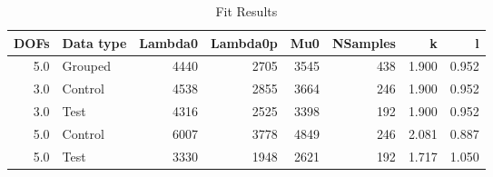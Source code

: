 \begin{table}
\centering
\caption{Fit Results}
\begin{tabular}{rlrrrrrr}
\toprule
 DOFs & Data type &  Lambda0 &  Lambda0p &   Mu0 &  NSamples &      k &      l \\
\midrule
  5.0 &   Grouped &     4440 &      2705 &  3545 &       438 &  1.900 &  0.952 \\
  3.0 &   Control &     4538 &      2855 &  3664 &       246 &  1.900 &  0.952 \\
  3.0 &      Test &     4316 &      2525 &  3398 &       192 &  1.900 &  0.952 \\
  5.0 &   Control &     6007 &      3778 &  4849 &       246 &  2.081 &  0.887 \\
  5.0 &      Test &     3330 &      1948 &  2621 &       192 &  1.717 &  1.050 \\
\bottomrule
\end{tabular}
\end{table}
